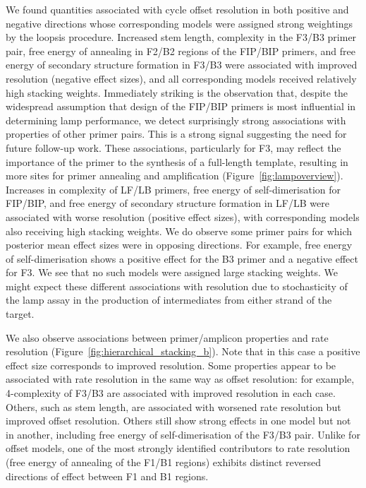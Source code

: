 \documentclass[../thesis.tex]{subfiles}
\begin{document}
We found quantities associated with cycle offset resolution in both positive and negative directions whose corresponding models were assigned strong weightings by the \gls{loopsis} procedure. Increased stem length, complexity in the F3/B3 primer pair, free energy of annealing in F2/B2 regions of the FIP/BIP primers, and free energy of secondary structure formation in F3/B3 were associated with improved resolution (negative effect sizes), and all corresponding models received relatively high stacking weights.
Immediately striking is the observation that, despite the widespread assumption that design of the FIP/BIP primers is most influential in determining \gls{lamp} performance, we detect surprisingly strong associations with properties of other primer pairs. This is a strong signal suggesting the need for future follow-up work.
These associations, particularly for F3, may reflect the importance of the primer to the synthesis of a full-length template, resulting in more sites for primer annealing and amplification (Figure~\ref{fig:lampoverview}). Increases in complexity of LF/LB primers, free energy of self-dimerisation for FIP/BIP, and free energy of secondary structure formation in LF/LB were associated with worse resolution (positive effect sizes), with corresponding models also receiving high stacking weights. We do observe some primer pairs for which posterior mean effect sizes were in opposing directions. For example, free energy of self-dimerisation shows a positive effect for the B3 primer and a negative effect for F3. We see that no such models were assigned large stacking weights. We might expect these different associations with resolution due to stochasticity of the \gls{lamp} assay in the production of intermediates from either strand of the target.

We also observe associations between primer/amplicon properties and rate resolution (Figure~\ref{fig:hierarchical_stacking_b}). Note that in this case a positive effect size corresponds to improved resolution. Some properties appear to be associated with rate resolution in the same way as offset resolution: for example, 4-complexity of F3/B3 are associated with improved resolution in each case. Others, such as stem length, are associated with worsened rate resolution but improved offset resolution. Others still show strong effects in one model but not in another, including free energy of self-dimerisation of the F3/B3 pair. Unlike for offset models, one of the most strongly identified contributors to rate resolution (free energy of annealing of the F1/B1 regions) exhibits distinct reversed directions of effect between F1 and B1 regions.
\end{document}
